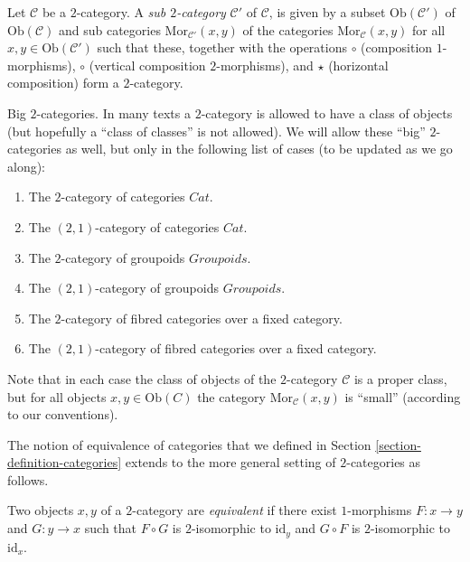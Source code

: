 \begin{definition}
\label{definition-sub-2-category}
Let $\mathcal{C}$ be a $2$-category.
A {\it sub $2$-category} $\mathcal{C}'$ of $\mathcal{C}$, is given by a subset
$\text{Ob}(\mathcal{C}')$ of $\text{Ob}(\mathcal{C})$
and sub categories $\text{Mor}_{\mathcal{C}'}(x, y)$ of the
categories $\text{Mor}_{\mathcal{C}}(x, y)$ for all
$x,y \in \text{Ob}(\mathcal{C}')$ such that these, together with
the operations $\circ$ (composition $1$-morphisms), $\circ$ (vertical
composition $2$-morphisms), and $\star$ (horizontal composition)
form a $2$-category.
\end{definition}

\begin{remark}
\label{remark-big-2-categories}
Big $2$-categories.
In many texts a $2$-category is allowed to have a class of
objects (but hopefully a ``class of classes'' is not allowed).
We will allow these ``big'' $2$-categories as well, but only
in the following list of cases (to be updated as we go along):
\begin{enumerate}
\item The $2$-category of categories $\textit{Cat}$.
\item The $(2, 1)$-category of categories $\textit{Cat}$.
\item The $2$-category of groupoids $\textit{Groupoids}$.
\item The $(2, 1)$-category of groupoids $\textit{Groupoids}$.
\item The $2$-category of fibred categories over a fixed category.
\item The $(2, 1)$-category of fibred categories over a fixed category.
\end{enumerate}
Note that in each case the class of objects of the $2$-category
$\mathcal{C}$ is a proper class, but for all objects $x, y \in \text{Ob}(C)$
the category $\text{Mor}_{\mathcal{C}}(x, y)$ is ``small'' (according to
our conventions).
\end{remark}

\noindent
The notion of equivalence of categories that we defined in Section
\ref{section-definition-categories} extends to the more general setting of
$2$-categories as follows.

\begin{definition}
\label{definition-equivalence}
Two objects $x, y$ of a $2$-category are {\it equivalent} if there exist
$1$-morphisms $F : x \to y$ and $G : y \to x$ such that $F \circ G$ is
$2$-isomorphic to $\text{id}_y$ and $G \circ F$ is $2$-isomorphic to
$\text{id}_x$.
\end{definition}

